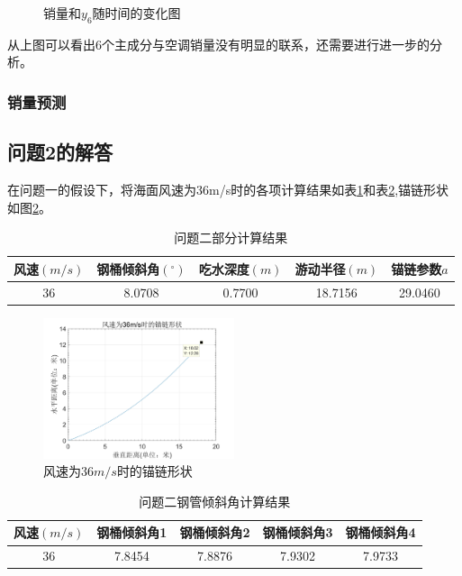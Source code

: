 \documentclass{cumcm}
\begin{document}
\begin{enumerate}
\begin{figure}[H]
\begin{minipage}[t]{0.5\linewidth}
			\caption{销量和$y_6$随时间的变化图}   
			\label{fig:pca6_sales}   
		  \end{minipage} 
	  \end{figure}
	从上图可以看出6个主成分与空调销量没有明显的联系，还需要进行进一步的分析。
\end{enumerate}

\subsubsection{销量预测}

\subsection{问题2的解答}
在问题一的假设下，将海面风速为36m/s时的各项计算结果如表\ref{table:result_2}和表\ref{table:pipe_angle_2},锚链形状如图\ref{fig:chain_shape_36}。
\begin{table}[!htp]
	\centering
	\caption{问题二部分计算结果}\label{table:result_2}
	\centering
	\begin{tabular*}{\textwidth}{ccccc}
		
		\hline
		风速$(m/s)$ & 钢桶倾斜角$(^\circ)$ & 吃水深度$(m)$ & 游动半径$(m)$ & 锚链参数$a$\\
		\hline
		36 & 8.0708 & 0.7700 & 18.7156  & 29.0460\\
		\hline
	\end{tabular*}
\end{table}
\begin{figure}[H]
	\centering
	\includegraphics*[width=0.5\textwidth]{img/36mschainfigure.jpg}
	\caption{风速为36$m/s$时的锚链形状}
	\label{fig:chain_shape_36}
\end{figure}
\begin{table}[H]
	\centering
	\caption{问题二钢管倾斜角计算结果}
	\label{table:pipe_angle_2}
	\begin{tabular*}{0.85\textwidth}{ccccc}
		\hline
		风速$(m/s)$ & 钢桶倾斜角1 & 钢桶倾斜角2 & 钢桶倾斜角3 & 钢桶倾斜角4\\
		\hline
		36 & 7.8454 & 7.8876 & 7.9302 & 7.9733\\
		\hline
	\end{tabular*}
\end{table}
\end{document}
